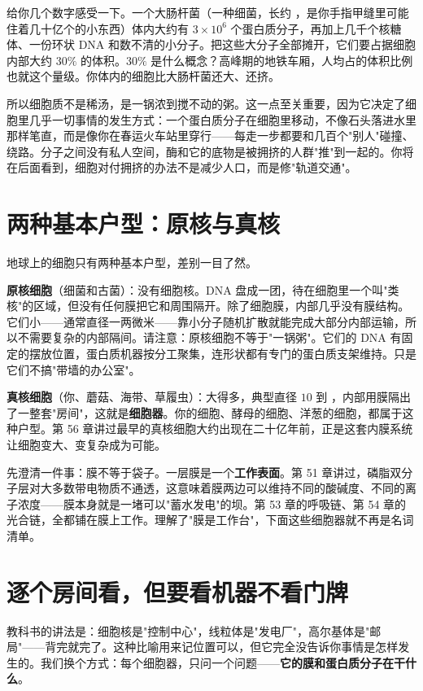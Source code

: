 给你几个数字感受一下。一个大肠杆菌（一种细菌，长约 ，是你手指甲缝里可能住着几十亿个的小东西）体内大约有 $3\times10^{6}$ 个蛋白质分子，再加上几千个核糖体、一份环状 DNA 和数不清的小分子。把这些大分子全部摊开，它们要占据细胞内部大约 $30\%$ 的体积。$30\%$ 是什么概念？高峰期的地铁车厢，人均占的体积比例也就这个量级。你体内的细胞比大肠杆菌还大、还挤。

所以细胞质不是稀汤，是一锅浓到搅不动的粥。这一点至关重要，因为它决定了细胞里几乎一切事情的发生方式：一个蛋白质分子在细胞里移动，不像石头落进水里那样笔直，而是像你在春运火车站里穿行——每走一步都要和几百个"别人"碰撞、绕路。分子之间没有私人空间，酶和它的底物是被拥挤的人群"推"到一起的。你将在后面看到，细胞对付拥挤的办法不是减少人口，而是修"轨道交通"。

\section{两种基本户型：原核与真核}

地球上的细胞只有两种基本户型，差别一目了然。

\textbf{原核细胞}（细菌和古菌）：没有细胞核。DNA 盘成一团，待在细胞里一个叫"类核"的区域，但没有任何膜把它和周围隔开。除了细胞膜，内部几乎没有膜结构。它们小——通常直径一两微米——靠小分子随机扩散就能完成大部分内部运输，所以不需要复杂的内部隔间。请注意：原核细胞不等于"一锅粥"。它们的 DNA 有固定的摆放位置，蛋白质机器按分工聚集，连形状都有专门的蛋白质支架维持。只是它们不搞"带墙的办公室"。

\textbf{真核细胞}（你、蘑菇、海带、草履虫）：大得多，典型直径 $10$ 到 ，内部用膜隔出了一整套"房间"，这就是\textbf{细胞器}。你的细胞、酵母的细胞、洋葱的细胞，都属于这种户型。第 56 章讲过最早的真核细胞大约出现在二十亿年前，正是这套内膜系统让细胞变大、变复杂成为可能。

先澄清一件事：膜不等于袋子。一层膜是一个\textbf{工作表面}。第 51 章讲过，磷脂双分子层对大多数带电物质不通透，这意味着膜两边可以维持不同的酸碱度、不同的离子浓度——膜本身就是一堵可以"蓄水发电"的坝。第 53 章的呼吸链、第 54 章的光合链，全都铺在膜上工作。理解了"膜是工作台"，下面这些细胞器就不再是名词清单。

\section{逐个房间看，但要看机器不看门牌}

教科书的讲法是：细胞核是"控制中心"，线粒体是"发电厂"，高尔基体是"邮局"——背完就完了。这种比喻用来记位置可以，但它完全没告诉你事情是怎样发生的。我们换个方式：每个细胞器，只问一个问题——\textbf{它的膜和蛋白质分子在干什么}。

